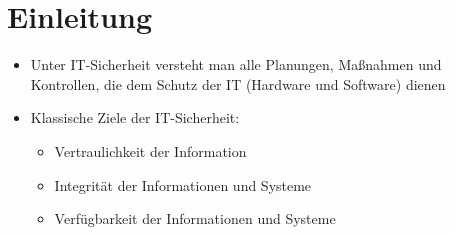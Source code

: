 


\begin{frame}[plain]
 \titlepage
\end{frame}




\section{Einleitung}


\begin{frame}
\begin{itemize}
	\item Unter IT-Sicherheit versteht man alle Planungen, Maßnahmen und Kontrollen, die dem Schutz der IT (Hardware und Software) dienen
	\item Klassische Ziele der IT-Sicherheit:
	\begin{itemize}
		\item Vertraulichkeit der Information
		\item Integrität der Informationen und Systeme
		\item Verfügbarkeit der Informationen und Systeme
	\end{itemize}
\end{itemize}
\end{frame}

